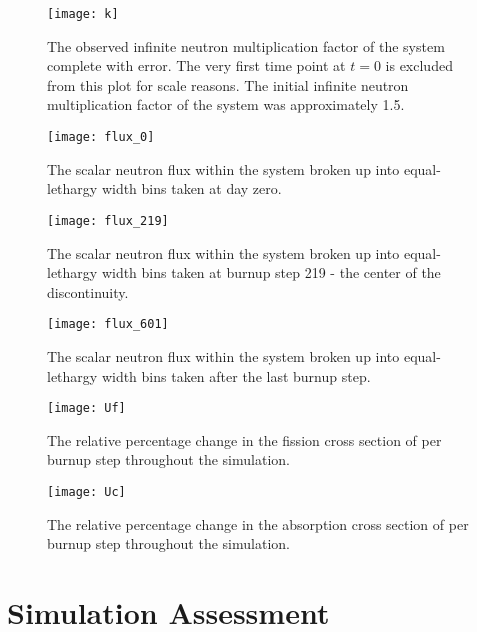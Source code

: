 \begin{figure}[H]
    \centering
    \texttt{[image: k]}
    \caption{The observed infinite neutron multiplication factor of the system
    complete with error. The very first time point at $t=0$ is excluded from
    this plot for scale reasons. The initial infinite neutron multiplication 
    factor of the system was approximately 1.5.}
    \label{fig:k}
\end{figure}

\begin{figure}[H]
    \centering
    \texttt{[image: flux\_0]}
    \caption{The scalar neutron flux within the system broken up into
    equal-lethargy width bins taken at day zero.}
    \label{fig:flux_0}
\end{figure}

\begin{figure}[H]
    \centering
    \texttt{[image: flux\_219]}
    \caption{The scalar neutron flux within the system broken up into
    equal-lethargy width bins taken at burnup step 219 - the center of the
    discontinuity.}
    \label{fig:flux_219}
\end{figure}

\begin{figure}[H]
    \centering
    \texttt{[image: flux\_601]}
    \caption{The scalar neutron flux within the system broken up into
    equal-lethargy width bins taken after the last burnup step.}
    \label{fig:flux_601}
\end{figure}

\begin{figure}[H]
    \centering
    \texttt{[image: Uf]}
    \caption{The relative percentage change in the fission cross section of
     per burnup step throughout the simulation.}
    \label{fig:uf}
\end{figure}

\begin{figure}[H]
    \centering
    \texttt{[image: Uc]}
    \caption{The relative percentage change in the absorption cross section of
     per burnup step throughout the simulation.}
    \label{fig:uc}
\end{figure}

\section{Simulation Assessment}\label{sec:disc}

